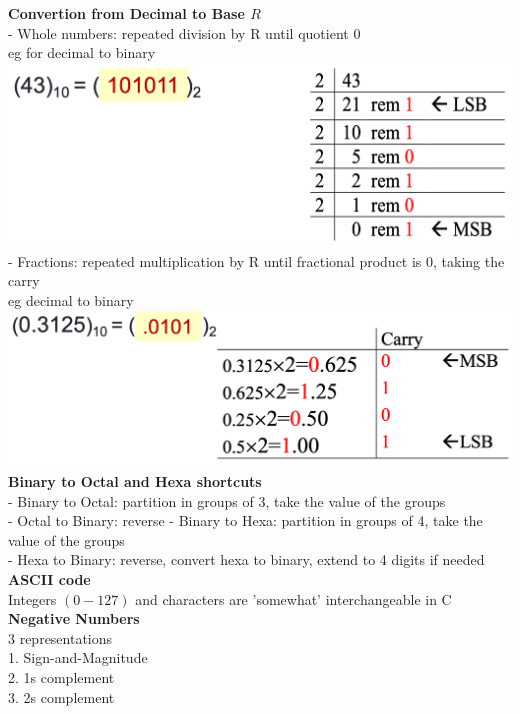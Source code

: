 \documentclass[10pt, a4paper]{article}
\begin{document}
\begin{multicols*}{3}
		\textbf{Convertion from Decimal to Base $R$}\\
		- Whole numbers: repeated division by R until quotient 0\\
		eg for decimal to binary\\
		\includegraphics[scale=0.25]{./assets/baseConversion}\\
		- Fractions: repeated multiplication by R until fractional product is 0, taking the carry\\
		eg decimal to binary \\
		\includegraphics[scale=0.25]{./assets/baseConversion2}\\
		
		\textbf{Binary to Octal and Hexa shortcuts}\\
		- Binary to Octal: partition in groups of 3, take the value of the groups\\
		- Octal to Binary: reverse
		- Binary to Hexa: partition in groups of 4, take the value of the groups\\
		- Hexa to Binary: reverse, convert hexa to binary, extend to 4 digits if needed\\
		
		\textbf{ASCII code}\\
		Integers $(0 - 127)$ and characters are 'somewhat' interchangeable in C\\
		
		\textbf{Negative Numbers}\\
		3 representations\\
		1. Sign-and-Magnitude\\
		2. 1s complement\\
		3. 2s complement\\
		

\end{multicols*}
\end{document}
